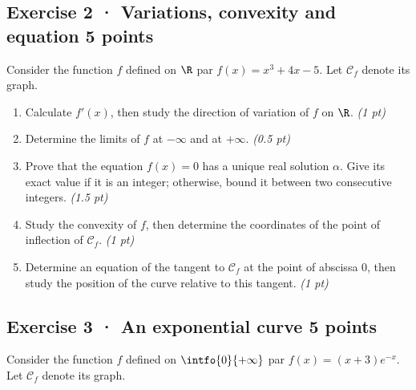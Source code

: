 \subsection*{Exercise 2 · Variations, convexity and equation \hfill 5 points}Consider the function $f$ defined on $\R$ par $f(x)=x^3+4x-5$. Let $\mathcal C_f$ denote its graph.

\begin{enumerate}

\item Calculate $f' (x)$, then study the direction of variation of $f$ on $\R$. \hfill\textit{(1 pt)}

\item Determine the limits of $f$ at $-\infty$ and at $+\infty$. \hfill\textit{(0.5 pt)}

\item Prove that the equation $f(x)=0$ has a unique real solution $\alpha$. Give its exact value if it is an integer; otherwise, bound it between two consecutive integers. \hfill\textit{(1.5 pt)}

\item Study the convexity of $f$, then determine the coordinates of the point of inflection of $\mathcal C_f$. \hfill\textit{(1 pt)}

\item Determine an equation of the tangent to $\mathcal C_f$ at the point of abscissa $0$, then study the position of the curve relative to this tangent. \hfill\textit{(1 pt)}

\end{enumerate}

\mxnewpage{}

\subsection*{Exercise 3 · An exponential curve \hfill 5 points}Consider the function $f$ defined on $\intfo{0}{+\infty}$ par $f(x)=(x+3)e^{-x}$. Let $\mathcal C_f$ denote its graph.

